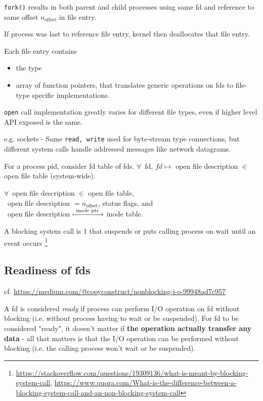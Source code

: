 \documentclass[10pt]{amsart}
\begin{document}
\begin{multicols*}{2}
\texttt{fork()} results in both parent and child processes using same fd and reference to same offset $n_{\text{offset}}$ in file entry.

If process was last to reference file entry, kernel then deallocates that file entry.


Each file entry contains
\begin{itemize}
	\item the type
	\item array of function pointers, that translates generic operations on fds to file-type specific implementations.
\end{itemize}

\texttt{open} call implementation greatly varies for different file types, even if higher level API exposed is the same.

e.g. sockets - Same \texttt{read, write} used for byte-stream type connections, but different system calls handle addressed messages like network datagrams.


For a process pid, consider fd table of fds. $\forall \, $ fd, $fd \mapsto $ open file description $\in$ open file table (system-wide).

$\forall \, $ open file description $\in $ open file table, \\
\qquad \, open file description $= n_{\text{offset}}$, status flags, and \\
\qquad \, open file description $\xmapsto{ \text{ inode ptr } }$ inode table.

A blocking system call is 1 that suspends or puts calling process on wait until an event occurs \footnote{\url{https://stackoverflow.com/questions/19309136/what-is-meant-by-blocking-system-call}, \url{https://www.quora.com/What-is-the-difference-between-a-blocking-system-call-and-an-non-blocking-system-call}}

\subsection{Readiness of fds}

cf. \url{https://medium.com/@copyconstruct/nonblocking-i-o-99948ad7c957}

A fd is considered \emph{ready} if process can perform I/O operation on fd without blocking (i.e. without process having to wait or be suspended). For fd to be considered "ready", it doesn't matter if \textbf{the operation actually transfer any data} - all that matters is that the I/O operation can be performed without blocking (i.e. the calling process won't wait or be suspended).


\end{multicols*}
\end{document}
